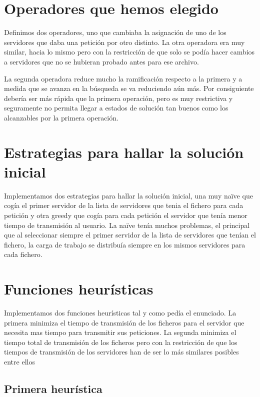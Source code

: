 \section{Operadores que hemos elegido}%
\label{sec:operadores_elegidos}

Definimos dos operadores, uno que cambiaba la asignación de uno de los servidores que daba una petición por otro distinto.
La otra operadora era muy similar, hacia lo mismo pero con la restricción de que solo se podía hacer cambios a servidores
que no se hubieran probado antes para ese archivo.

La segunda operadora reduce mucho la ramificación respecto a la primera y a medida que se avanza en la búsqueda se va
reduciendo aún más. Por consiguiente debería ser más rápida que la primera operación, pero es muy restrictiva y seguramente
no permita llegar a estados de solución tan buenos como los alcanzables por la primera operación.

\section{Estrategias para hallar la solución inicial}
\label{sec:estrat_sol}

Implementamos dos estrategias para hallar la solución inicial, una muy naïve que cogía el primer servidor
de la lista de servidores que tenia el fichero para cada petición y otra greedy que cogía para cada petición
el servidor que tenía menor tiempo de transmisión al usuario. La naïve tenía muchos problemas, el principal
que al seleccionar siempre el primer servidor de la lista de servidores que tenían el fichero, la carga de
trabajo se distribuía siempre en los mismos servidores para cada fichero.

\pagebreak
\section{Funciones heurísticas}

Implementamos dos funciones heurísticas tal y como pedía el enunciado. La primera minimiza el tiempo de transmisión
de los ficheros para el servidor que necesita mas tiempo para transmitir sus peticiones. La segunda minimiza
el tiempo total de transmisión de los ficheros pero con la restricción de que los tiempos de transmisión de los servidores
han de ser lo más similares posibles entre ellos

\subsection{Primera heurística}

